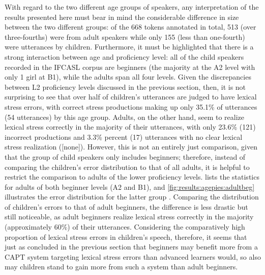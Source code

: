 				With regard to the two different age groups of speakers, any interpretation of the results presented here must bear in mind the considerable difference in size between the two different groups:  of the 668 tokens annotated in total, 513 (over three-fourths) were from adult speakers while only 155 (less than one-fourth) were utterances by children. Furthermore, it must be highlighted that there is a strong interaction between age and proficiency level: all of the child speakers recorded in the IFCASL corpus are beginners 
				(the majority at the A2 level with only 1 girl at B1),
				while the adults span all four levels. Given the discrepancies between L2 proficiency levels discussed in the previous section, then, it is not surprising to see that over half of children's utterances are judged to have lexical stress errors, with correct stress productions making up only 35.1\% of utterances (54 utterances) by this age group. Adults, on the other hand, seem to realize lexical stress correctly in the majority of their utterances, with only 23.6\% (121) incorrect productions and 3.3\% percent (17) utterances with no clear lexical stress realization ([none]). However, this is not an entirely just comparison, given that the group of child speakers only includes beginners; therefore, instead of comparing the children's error distribution to that of all adults, it is helpful to restrict the comparison to adults of the lower proficiency levels. 
				 lists the statistics for 
				adults of both beginner levels (A2 and B1), 
				and \cref{fig:results:agepies:adultbeg} illustrates the error distribution for the latter group . 
				Comparing the distribution of children's errors to that of adult beginners, the difference is less drastic but still noticeable, as adult beginners realize lexical stress correctly in the majority (approximately 60\%) of their utterances. Considering the comparatively high proportion of lexical stress errors in children's speech, therefore, it seems that just as  concluded in the previous section that beginners may benefit more from a CAPT system targeting lexical stress errors than advanced learners would, so also may children stand to gain more from such a system than adult beginners. 
				
